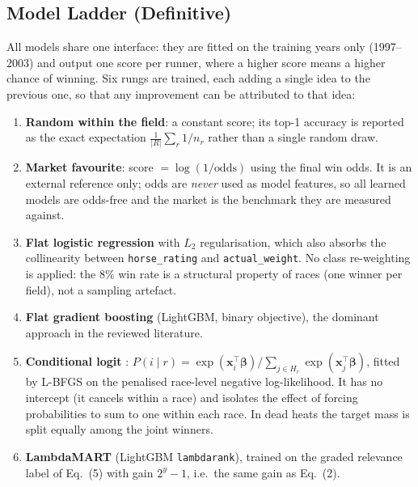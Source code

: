 
\subsection{Model Ladder (Definitive)}

All models share one interface: they are fitted on the training years only
(1997--2003) and output one score per runner, where a higher score means a
higher chance of winning. Six rungs are trained, each adding a single idea to
the previous one, so that any improvement can be attributed to that idea:

\begin{enumerate}
  \item \textbf{Random within the field}: a constant score; its top-1 accuracy
        is reported as the exact expectation $\frac{1}{|R|}\sum_r 1/n_r$ rather
        than a single random draw.
  \item \textbf{Market favourite}: score $= \log(1/\text{odds})$ using the final
        win odds. It is an external reference only; odds are \emph{never} used
        as model features, so all learned models are odds-free and the market
        is the benchmark they are measured against.
  \item \textbf{Flat logistic regression} with $L_2$ regularisation, which also
        absorbs the collinearity between \texttt{horse\_rating} and
        \texttt{actual\_weight}. No class re-weighting is applied: the 8\% win
        rate is a structural property of races (one winner per field), not a
        sampling artefact.
  \item \textbf{Flat gradient boosting} (LightGBM, binary objective), the
        dominant approach in the reviewed literature.
  \item \textbf{Conditional logit} \cite{mcfadden}:
        $P(i \mid r) = \exp(\mathbf{x}_i^\top\boldsymbol\beta) /
        \sum_{j \in H_r} \exp(\mathbf{x}_j^\top\boldsymbol\beta)$, fitted by
        L-BFGS on the penalised race-level negative log-likelihood. It has no
        intercept (it cancels within a race) and isolates the effect of forcing
        probabilities to sum to one within each race. In dead heats the target
        mass is split equally among the joint winners.
  \item \textbf{LambdaMART} (LightGBM \texttt{lambdarank}), trained on the graded
        relevance label of Eq.~(5) with gain $2^{y}-1$, i.e.\ the same gain as
        Eq.~(2).
\end{enumerate}

